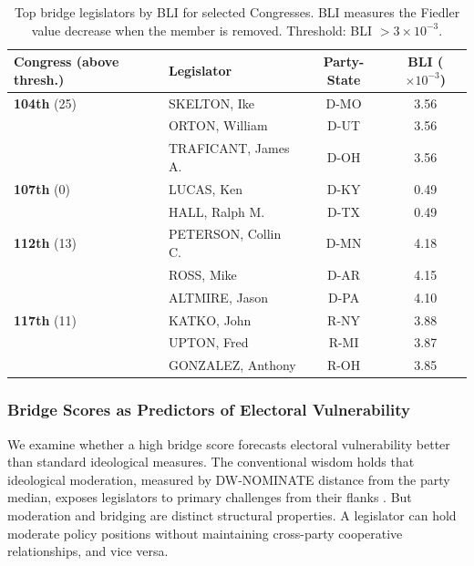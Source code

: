 \documentclass[12pt, a4paper]{article}
\begin{document}
\begin{table}[!htbp]
\centering
{\scriptsize
\caption{Top bridge legislators by BLI for selected Congresses. BLI measures the Fiedler value decrease when the member is removed. Threshold: BLI $> 3 \times 10^{-3}$.}
\label{tab:bridge_legislators}
\begin{tabular}{llcc}
\toprule
Congress (above thresh.) & Legislator & Party-State & BLI ($\times 10^{-3}$) \\
\midrule
\textbf{104th} (25) & SKELTON, Ike & D-MO & 3.56 \\
 & ORTON, William & D-UT & 3.56 \\
 & TRAFICANT, James A. & D-OH & 3.56 \\
\midrule
\textbf{107th} (0) & LUCAS, Ken & D-KY & 0.49 \\
 & HALL, Ralph M. & D-TX & 0.49 \\
\midrule
\textbf{112th} (13) & PETERSON, Collin C. & D-MN & 4.18 \\
 & ROSS, Mike & D-AR & 4.15 \\
 & ALTMIRE, Jason & D-PA & 4.10 \\
\midrule
\textbf{117th} (11) & KATKO, John & R-NY & 3.88 \\
 & UPTON, Fred & R-MI & 3.87 \\
 & GONZALEZ, Anthony & R-OH & 3.85 \\
\bottomrule
\end{tabular}
}
\end{table}

\subsubsection{Bridge Scores as Predictors of Electoral Vulnerability}

We examine whether a high bridge score forecasts electoral vulnerability better than standard ideological measures. The conventional wisdom holds that ideological moderation, measured by DW-NOMINATE distance from the party median, exposes legislators to primary challenges from their flanks \citep{mann2012}. But moderation and bridging are distinct structural properties. A legislator can hold moderate policy positions without maintaining cross-party cooperative relationships, and vice versa.
\end{document}
